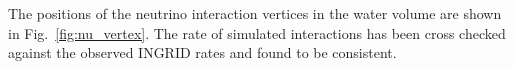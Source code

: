 
The positions of the neutrino interaction vertices in the \nuprism water volume are shown in Fig.~\ref{fig:nu_vertex}.
The rate of simulated interactions has been cross checked against the observed INGRID rates%
and found to be consistent.

